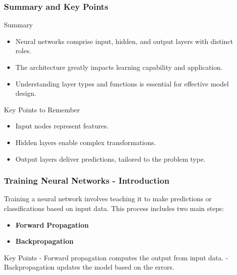 \documentclass[aspectratio=169]{beamer}
\begin{document}
\begin{frame}[fragile]
    \frametitle{Summary and Key Points}
    
    \begin{block}{Summary}
        \begin{itemize}
            \item Neural networks comprise input, hidden, and output layers with distinct roles.
            \item The architecture greatly impacts learning capability and application.
            \item Understanding layer types and functions is essential for effective model design.
        \end{itemize}
    \end{block}
    
    \begin{block}{Key Points to Remember}
        \begin{itemize}
            \item Input nodes represent features.
            \item Hidden layers enable complex transformations.
            \item Output layers deliver predictions, tailored to the problem type.
        \end{itemize}
    \end{block}
\end{frame}

\begin{frame}[fragile]
    \frametitle{Training Neural Networks - Introduction}
    Training a neural network involves teaching it to make predictions or classifications based on input data. This process includes two main steps: 
    \begin{itemize}
        \item \textbf{Forward Propagation}
        \item \textbf{Backpropagation}
    \end{itemize}
    \begin{block}{Key Points}
        - Forward propagation computes the output from input data.
        - Backpropagation updates the model based on the errors.
    \end{block}
\end{frame}
\end{document}
